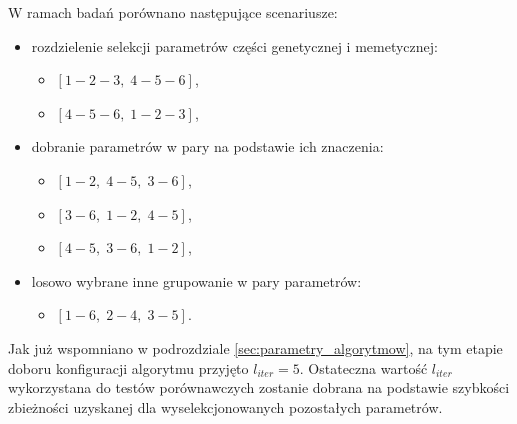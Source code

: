 \par
W ramach badań porównano następujące scenariusze:
\begin{itemize}
\item rozdzielenie selekcji parametrów części genetycznej i memetycznej:
\begin{itemize}
\item $[1-2-3,\; 4-5-6]$,
\item $[4-5-6,\; 1-2-3]$,
\end{itemize}
\item dobranie parametrów w pary na podstawie ich znaczenia:
\begin{itemize}
\item $[1-2,\; 4-5,\; 3-6]$,
\item $[3-6,\; 1-2,\; 4-5]$,
\item $[4-5,\; 3-6,\; 1-2]$,
\end{itemize}
\item losowo wybrane inne grupowanie w pary parametrów:
\begin{itemize}
\item $[1-6,\; 2-4,\; 3-5]$.
\end{itemize}
\end{itemize}
\par
Jak już wspomniano w podrozdziale \ref{sec:parametry_algorytmow}, na tym etapie doboru konfiguracji algorytmu przyjęto $l_{iter}=5$. Ostateczna wartość $l_{iter}$ wykorzystana do testów porównawczych zostanie dobrana na podstawie szybkości zbieżności uzyskanej dla wyselekcjonowanych pozostałych parametrów.

